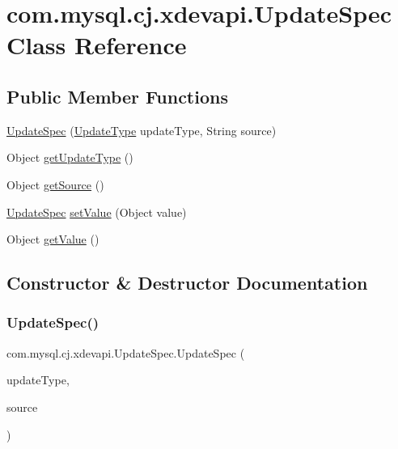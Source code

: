 \hypertarget{classcom_1_1mysql_1_1cj_1_1xdevapi_1_1_update_spec}{}\section{com.\+mysql.\+cj.\+xdevapi.\+Update\+Spec Class Reference}
\label{classcom_1_1mysql_1_1cj_1_1xdevapi_1_1_update_spec}
\subsection*{Public Member Functions}
\begin{DoxyCompactItemize}
\item 
\mbox{\hyperlink{classcom_1_1mysql_1_1cj_1_1xdevapi_1_1_update_spec_ac481cb6f44ccba4764978830a608302d}{Update\+Spec}} (\mbox{\hyperlink{enumcom_1_1mysql_1_1cj_1_1xdevapi_1_1_update_type}{Update\+Type}} update\+Type, String source)
\item 
Object \mbox{\hyperlink{classcom_1_1mysql_1_1cj_1_1xdevapi_1_1_update_spec_ad8b4b729a65bca6b5604b1cf7cbca626}{get\+Update\+Type}} ()
\item 
Object \mbox{\hyperlink{classcom_1_1mysql_1_1cj_1_1xdevapi_1_1_update_spec_a09578e6d12432259c45c18d6b02acde8}{get\+Source}} ()
\item 
\mbox{\hyperlink{classcom_1_1mysql_1_1cj_1_1xdevapi_1_1_update_spec}{Update\+Spec}} \mbox{\hyperlink{classcom_1_1mysql_1_1cj_1_1xdevapi_1_1_update_spec_a277cb0b37a9c3329c25b65c2904f069c}{set\+Value}} (Object value)
\item 
Object \mbox{\hyperlink{classcom_1_1mysql_1_1cj_1_1xdevapi_1_1_update_spec_afc7fc71a9819d5dcf30bfe70b7faf515}{get\+Value}} ()
\end{DoxyCompactItemize}


\subsection{Constructor \& Destructor Documentation}
\mbox{\label{classcom_1_1mysql_1_1cj_1_1xdevapi_1_1_update_spec_ac481cb6f44ccba4764978830a608302d}} 
\subsubsection{\texorpdfstring{Update\+Spec()}{UpdateSpec()}}
{\footnotesize\ttfamily com.\+mysql.\+cj.\+xdevapi.\+Update\+Spec.\+Update\+Spec (\begin{DoxyParamCaption}\item[{\mbox{\hyperlink{enumcom_1_1mysql_1_1cj_1_1xdevapi_1_1_update_type}{Update\+Type}}}]{update\+Type,  }\item[{String}]{source }\end{DoxyParamCaption})}




